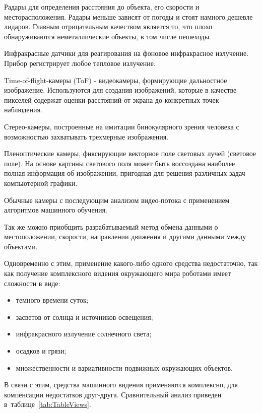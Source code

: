 Радары для определения расстояния до объекта, его скорости и месторасположения. Радары меньше зависят от погоды и стоят намного дешевле лидаров. Главным отрицательным качеством является то, что плохо обнаруживаются неметаллические объекты, в том числе пешеходы.

Инфракрасные датчики для реагирования на фоновое инфракрасное излучение. Прибор регистрирует любое тепловое излучение.

Time-of-flight-камеры (ToF) - видеокамеры, формирующие дальностное изображение. Используются для создания изображений, которые в качестве пикселей содержат оценки расстояний от экрана до конкретных точек наблюдения.

Стерео-камеры, построенные на имитации бинокулярного зрения человека с возможностью захватывать трехмерные изображения.

Пленоптические камеры, фиксирующие векторное поле световых лучей (световое поле). На основе картины светового поля может быть воссоздана наиболее полная информация об изображении, пригодная для решения различных задач компьютерной графики.

Обычные камеры с последующим анализом видео-потока с применением алгоритмов машинного обучения.

Так же можно приобщить разрабатываемый метод обмена данными о местоположении, скорости, направлении движения и другими данными между объектами.

Одновременно с этим, применение какого-либо одного средства недостаточно, так как получение комплексного видения окружающего мира роботами имеет сложности в виде:

\begin{itemize}
    \item темного времени суток;
    \item засветов от солнца и источников освещения;
    \item инфракрасного излучение солнечного света;
    \item осадков и грязи;
    \item множественности и вариативности подвижных окружающих объектов.
\end{itemize}

В связи с этим, средства машинного видения применяются комплексно, для компенсации недостатков друг-друга. Сравнительный анализ приведен в~таблице~\ref{tab:TableViews}.


